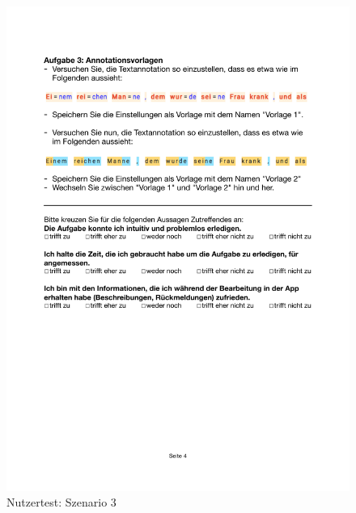 \begin{figure}
	\centering
	\includegraphics[width=.95\linewidth, frame]{figures/evaluation/test3}
	\caption{Nutzertest: Szenario 3}
	\label{fig:evaluation-test3}
\end{figure}
\newpage

